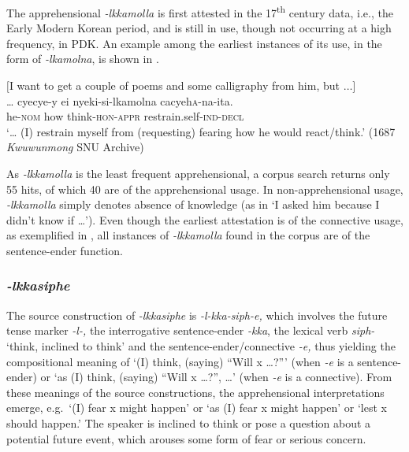 \documentclass[output=paper,colorlinks,citecolor=brown]{langscibook}
\begin{document}
The apprehensional \textit{-lkkamolla} is first attested in the 17\textsuperscript{th} century data, i.e., the Early Modern Korean period, and is still in use, though not occurring at a high frequency, in PDK. An example among the earliest instances of its use, in the form of \textit{-lkamolna}, is shown in .


\ea \label{ex:RK8} \textnormal{$[$I want to get a couple of poems and some calligraphy from him, but $\ldots]$} \\
\gll … cyecye-y ei nyeki-si-lkamolna cacyeh\textsc{a}-na-ita. \\
{} he-\textsc{nom} how think-\textsc{hon-appr} restrain.self-\textsc{ind-decl} \\
\glt `… (I) restrain myself from (requesting) fearing how he would react/think.' (1687 \textit{Kwuwunmong} SNU Archive)
\z


 As \textit{-lkkamolla} is the least frequent apprehensional, a corpus search returns only 55 hits, of which 40 are of the apprehensional usage. In non-apprehensional usage, \textit{-lkkamolla} simply denotes absence of knowledge (as in `I asked him because I didn't know if …').  Even though the earliest attestation is of the connective usage, as exemplified in , all instances of \textit{-lkkamolla} found in the corpus are of the sentence-ender function.

\subsubsection{\textit{-lkkasiphe}} 
The source construction of \textit{-lkkasiphe} is \textit{-l-kka-siph-e,} which involves the future tense marker \textit{-l-,} the interrogative sentence-ender \textit{-kka}, the lexical verb \textit{siph-} `think, inclined to think' and the sentence-ender/connective \textit{-e,} thus yielding the compositional meaning of `(I) think, (saying) ``Will x …?''' (when \textit{-e} is a sentence-ender) or `as (I) think, (saying) ``Will x …?'',  …' (when \textit{-e} is a connective). From these meanings of the source constructions, the apprehensional interpretations emerge, e.g.\  `(I) fear x might happen' or `as (I) fear x might happen' or `lest x should happen.' The speaker is inclined to think or pose a question about a potential future event, which arouses some form of fear or serious concern.
\end{document}
